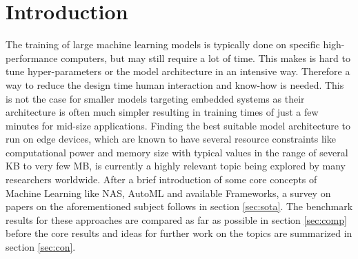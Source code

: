 \documentclass[10pt,        %
               a4paper,     %
               journal,     %
               ]{IEEEtran}
\begin{document}



%
\setlength{\tabcolsep}{2pt}

\section{Introduction}\label{sec:intro}

The training of large machine learning models is typically done on specific high-performance computers, but may still require a lot of time. This makes is hard to tune hyper-parameters or the model architecture in an intensive way. Therefore a way to reduce the design time human interaction and know-how is needed. This is not the case for smaller models targeting embedded systems as their architecture is often much simpler resulting in training times of just a few minutes for mid-size applications. Finding the best suitable model architecture to run on  edge devices, which are known to have several resource constraints like computational power and memory size with typical values in the range of several KB to very few MB, is currently a highly relevant topic being explored by many researchers worldwide. After a brief introduction of some core concepts of Machine Learning like NAS, AutoML and available Frameworks, a survey on papers on the aforementioned subject follows in section \ref{sec:sota}. The benchmark results for these approaches are compared as far as possible in section \ref{sec:comp} before the core results and ideas for further work on the topics are summarized in section \ref{sec:con}.
\end{document}
